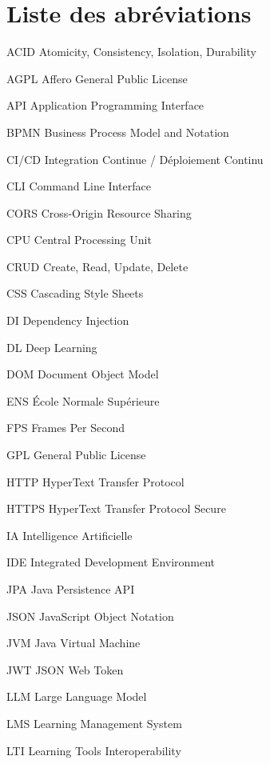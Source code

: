 \chapter*{Liste des abréviations}

\begin{abbrv}

    \item[ACID] Atomicity, Consistency, Isolation, Durability
    \item[AGPL] Affero General Public License
    \item[API] Application Programming Interface
    \item[BPMN] Business Process Model and Notation
    \item[CI/CD] Integration Continue / Déploiement Continu
    \item[CLI] Command Line Interface
    \item[CORS] Cross-Origin Resource Sharing
    \item[CPU] Central Processing Unit
    \item[CRUD] Create, Read, Update, Delete
    \item[CSS] Cascading Style Sheets
    \item[DI] Dependency Injection
    \item[DL] Deep Learning
    \item[DOM] Document Object Model
    \item[ENS] École Normale Supérieure
    \item[FPS] Frames Per Second
    \item[GPL] General Public License
    \item[HTTP] HyperText Transfer Protocol
    \item[HTTPS] HyperText Transfer Protocol Secure
    \item[IA] Intelligence Artificielle
    \item[IDE] Integrated Development Environment
    \item[JPA] Java Persistence API
    \item[JSON] JavaScript Object Notation
    \item[JVM] Java Virtual Machine
    \item[JWT] JSON Web Token
    \item[LLM] Large Language Model
    \item[LMS] Learning Management System
    \item[LTI] Learning Tools Interoperability

\end{abbrv}
